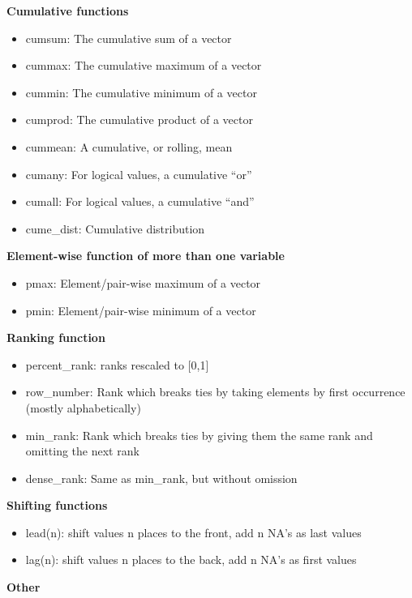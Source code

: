 \documentclass[]{tufte-book}
\providecommand{\tightlist}{%
  \setlength{\itemsep}{0pt}\setlength{\parskip}{0pt}}
\begin{document}
\textbf{Cumulative functions}

\begin{itemize}
\tightlist
\item
  cumsum: The cumulative sum of a vector
\item
  cummax: The cumulative maximum of a vector
\item
  cummin: The cumulative minimum of a vector
\item
  cumprod: The cumulative product of a vector
\item
  cummean: A cumulative, or rolling, mean
\item
  cumany: For logical values, a cumulative ``or''
\item
  cumall: For logical values, a cumulative ``and''
\item
  cume\_dist: Cumulative distribution
\end{itemize}

\textbf{Element-wise function of more than one variable}

\begin{itemize}
\tightlist
\item
  pmax: Element/pair-wise maximum of a vector
\item
  pmin: Element/pair-wise minimum of a vector
\end{itemize}

\textbf{Ranking function}

\begin{itemize}
\tightlist
\item
  percent\_rank: ranks rescaled to {[}0,1{]}
\item
  row\_number: Rank which breaks ties by taking elements by first occurrence (mostly alphabetically)
\item
  min\_rank: Rank which breaks ties by giving them the same rank and omitting the next rank
\item
  dense\_rank: Same as min\_rank, but without omission
\end{itemize}

\textbf{Shifting functions}

\begin{itemize}
\tightlist
\item
  lead(n): shift values n places to the front, add n NA's as last values
\item
  lag(n): shift values n places to the back, add n NA's as first values
\end{itemize}

\textbf{Other}
\end{document}
